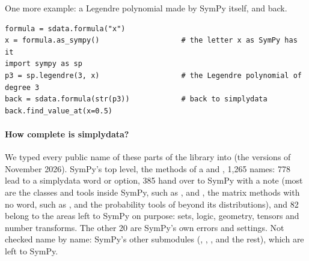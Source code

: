 One more example: a Legendre polynomial made by SymPy itself, and back.

\begin{lstlisting}[style=py]
formula = sdata.formula("x")
x = formula.as_sympy()                   # the letter x as SymPy has it
import sympy as sp
p3 = sp.legendre(3, x)                   # the Legendre polynomial of degree 3
back = sdata.formula(str(p3))            # back to simplydata
back.find_value_at(x=0.5)
\end{lstlisting}

\paragraph{How complete is simplydata?}
We typed every public name of these parts of the library into  (the versions of November 2026).
SymPy's top level, the methods of a  and , 1,265 names: 778 lead to a simplydata
word or option, 385 hand over to SymPy with a note (most are the classes and tools inside SymPy, such as
,  and , the matrix methods with no word, such as , and the
probability tools of  beyond its distributions), and 82 belong to the areas left to SymPy on
purpose: sets, logic, geometry, tensors and number transforms. The other 20 are SymPy's own errors and settings.
Not checked name by name: SymPy's other submodules (, , ,
 and the rest), which are left to SymPy.

